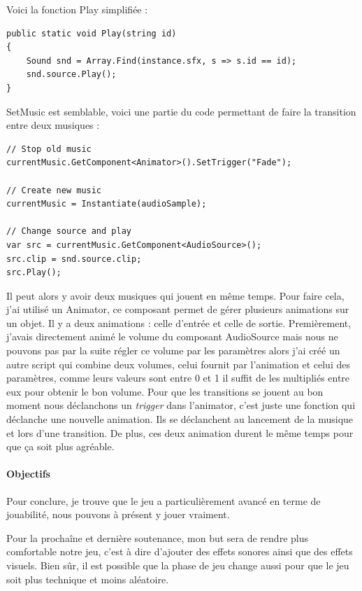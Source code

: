 \documentclass{article}
\begin{document}
Voici la fonction Play simplifiée :
\begin{lstlisting}
public static void Play(string id)
{
    Sound snd = Array.Find(instance.sfx, s => s.id == id);
    snd.source.Play();
}
\end{lstlisting}

SetMusic est semblable, voici une partie du code permettant de faire la transition entre deux musiques :
\begin{lstlisting}
// Stop old music
currentMusic.GetComponent<Animator>().SetTrigger("Fade");

// Create new music
currentMusic = Instantiate(audioSample);

// Change source and play
var src = currentMusic.GetComponent<AudioSource>();
src.clip = snd.source.clip;
src.Play();
\end{lstlisting}

Il peut alors y avoir deux musiques qui jouent en même temps. Pour faire cela, j'ai utilisé un Animator, ce composant permet de gérer plusieurs animations sur un objet. Il y a deux animations : celle d'entrée et celle de sortie. Premièrement, j'avais directement animé le volume du composant AudioSource mais nous ne pouvons pas par la suite régler ce volume par les paramètres alors j'ai créé un autre script qui combine deux volumes, celui fournit par l'animation et celui des paramètres, comme leurs valeurs sont entre 0 et 1 il suffit de les multipliés entre eux pour obtenir le bon volume. Pour que les transitions se jouent au bon moment nous déclanchons un \emph{trigger} dans l'animator, c'est juste une fonction qui déclanche une nouvelle animation. Ils se déclanchent au lancement de la musique et lors d'une transition. De plus, ces deux animation durent le même temps pour que ça soit plus agréable.

\paragraph{Objectifs}

Pour conclure, je trouve que le jeu a particulièrement avancé en terme de jouabilité, nous pouvons à présent y jouer vraiment.

Pour la prochaîne et dernière soutenance, mon but sera de rendre plus comfortable notre jeu, c'est à dire d'ajouter des effets sonores ainsi que des effets visuels. Bien sûr, il est possible que la phase de jeu change aussi pour que le jeu soit plus technique et moins aléatoire. 


\end{document}
